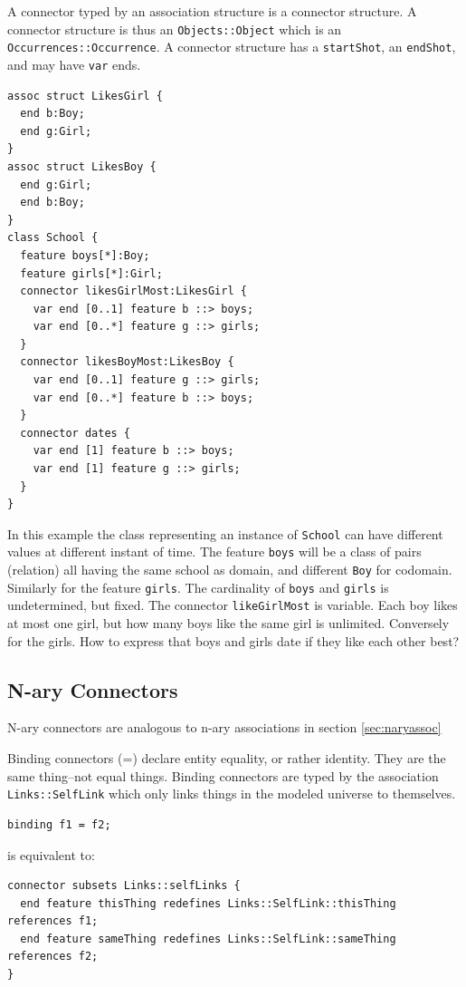 \pn A connector typed by an association structure is a connector structure.  A connector structure is thus an \texttt{Objects::Object} which is an \texttt{Occurrences::Occurrence}.  A connector structure has a \texttt{startShot}, an \texttt{endShot}, and may have \texttt{var} ends.

\begin{lstlisting}
assoc struct LikesGirl {
  end b:Boy;
  end g:Girl;
}
assoc struct LikesBoy {
  end g:Girl;
  end b:Boy;
}
class School {
  feature boys[*]:Boy;
  feature girls[*]:Girl;
  connector likesGirlMost:LikesGirl {
    var end [0..1] feature b ::> boys;
    var end [0..*] feature g ::> girls;
  }
  connector likesBoyMost:LikesBoy {
    var end [0..1] feature g ::> girls;
    var end [0..*] feature b ::> boys;
  }
  connector dates {
    var end [1] feature b ::> boys;
    var end [1] feature g ::> girls;
  }  
}
\end{lstlisting}

\pn In this example the class representing an instance of \texttt{School} can have different values at different instant of time.
The feature \texttt{boys} will be a class of pairs (relation) all having the same school as domain, and different \texttt{Boy} for codomain.
Similarly for the feature \texttt{girls}.  The cardinality of \texttt{boys} and \texttt{girls} is undetermined, but fixed.  The connector \texttt{likeGirlMost} is variable.  Each boy likes at most one girl, but how many boys like the same girl is unlimited.  Conversely for the girls.  How to express that boys and girls date if they like each other best?

\subsection{N-ary Connectors}

N-ary connectors are analogous to n-ary associations in section \ref{sec:naryassoc}


\pn Binding connectors (=) declare entity equality, or rather identity.  They are the same thing--not equal things.
Binding connectors are typed by the association \texttt{Links::SelfLink} which only links things in the
modeled universe to themselves.

\begin{lstlisting}
binding f1 = f2;
\end{lstlisting}
is equivalent to:
\begin{lstlisting}
connector subsets Links::selfLinks {
  end feature thisThing redefines Links::SelfLink::thisThing references f1;
  end feature sameThing redefines Links::SelfLink::sameThing references f2;
}
\end{lstlisting}

